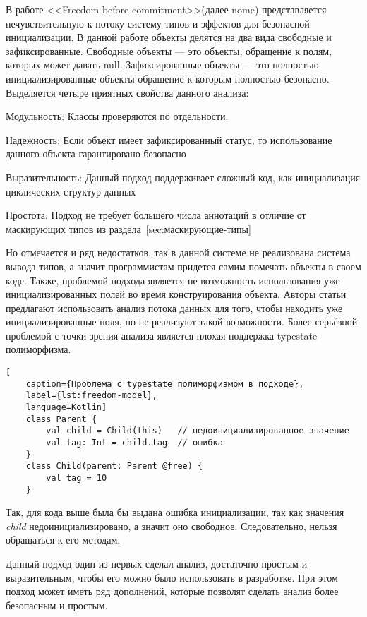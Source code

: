 В работе <<Freedom before commitment>>(далее nome)\cite{the-freedom-model} представляется нечувствительную к потоку
систему типов и эффектов для безопасной инициализации.
В данной работе объекты делятся на два вида свободные и зафиксированные.
Свободные объекты --- это объекты, обращение к полям, которых может давать null.
Зафиксированные объекты --- это полностью инициализированные объекты обращение к которым полностью безопасно.
Выделяется четыре приятных свойства данного анализа:
\begin{itemize*}
    \item Модульность: Классы проверяются по отдельности.
    \item Надежность: Если объект имеет зафиксированный статус, то использование данного объекта гарантировано безопасно
    \item Выразительность: Данный подход поддерживает сложный код, как инициализация циклических структур данных
    \item Простота: Подход не требует большего числа аннотаций в отличие от маскирующих типов из раздела~\ref{sec:маскирующие-типы}
\end{itemize*}

Но отмечается и ряд недостатков, так в данной системе не реализована система вывода типов,
а значит программистам придется самим помечать объекты в своем коде.
Также, проблемой подхода является не возможность использования уже инициализированных полей во время конструирования объекта.
Авторы статьи предлагают использовать анализ потока данных для того, чтобы находить уже инициализированные поля,
но не реализуют такой возможности.
Более серьёзной проблемой с точки зрения анализа является плохая поддержка typestate полиморфизма.
\begin{lstlisting}[
    caption={Проблема c typestate полиморфизмом в подходе},
    label={lst:freedom-model},
    language=Kotlin]
    class Parent {
        val child = Child(this)   // недоинициализированное значение
        val tag: Int = child.tag  // ошибка
    }
    class Child(parent: Parent @free) {
        val tag = 10
    }
\end{lstlisting}
Так, для кода выше была бы выдана ошибка инициализации, так как значения \emph{child} недоинициализировано,
а значит оно свободное.
Следовательно, нельзя обращаться к его методам.

Данный подход один из первых сделал анализ, достаточно простым и выразительным, чтобы его можно было использовать в разработке.
При этом подход может иметь ряд дополнений, которые позволят сделать анализ более безопасным и простым.

